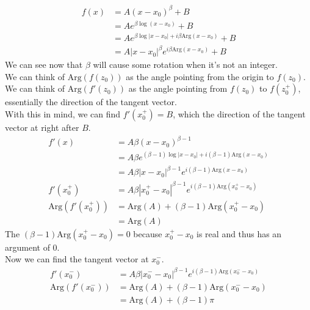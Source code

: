 \begin{proposition}
\begin{align*}
        f(x) & = A(x - x_0)^\beta + B                                      \\
             & = Ae^{\beta \log(x - x_0)} + B                              \\
             & = Ae^{\beta \log|x - x_0| + i\beta \text{Arg}(x - x_0)} + B \\
             & = A|x - x_0|^\beta e^{i\beta \text{Arg}(x - x_0)} + B
    \end{align*}
    We can see now that $\beta$ will cause some rotation when it's not an integer.\\
    We can think of $\text{Arg}(f(z_0))$ as the angle pointing from the origin to $f(z_0)$.\\
    We can think of $\text{Arg}(f'(z_0))$ as the angle pointing from $f(z_0)$ to $f(z_0^+)$, essentially the direction of the tangent vector.\\
    With this in mind, we can find $f'(x_0^+) = B$, which the direction of the tangent vector at right after $B$.
    \begin{align*}
        f'(x)                 & = A\beta(x - x_0)^{\beta - 1}                                              \\
                              & = A\beta e^{(\beta - 1)\log|x - x_0| + i(\beta - 1)\text{Arg}(x - x_0)}    \\
                              & = A\beta |x - x_0|^{\beta - 1} e^{i(\beta - 1)\text{Arg}(x - x_0)}         \\
        f'(x_0^+)             & = A\beta |x_0^+ - x_0|^{\beta - 1} e^{i(\beta - 1)\text{Arg}(x_0^+ - x_0)} \\
        \text{Arg}(f'(x_0^+)) & = \text{Arg}(A) + (\beta - 1)\text{Arg}(x_0^+ - x_0)                       \\
                              & = \text{Arg}(A)
    \end{align*}
    The $(\beta - 1)\text{Arg}(x_0^+ - x_0) = 0$ because $x_0^+ - x_0$ is real and thus has an argument of $0$.\\
    Now we can find the tangent vector at $x_0^-$.\\
    \begin{align*}
        f'(x_0^-)             & = A\beta |x_0^- - x_0|^{\beta - 1} e^{i(\beta - 1)\text{Arg}(x_0^- - x_0)} \\
        \text{Arg}(f'(x_0^-)) & = \text{Arg}(A) + (\beta - 1)\text{Arg}(x_0^- - x_0)                       \\
                              & = \text{Arg}(A) + (\beta - 1)\pi

\end{align*}
\end{proposition}
